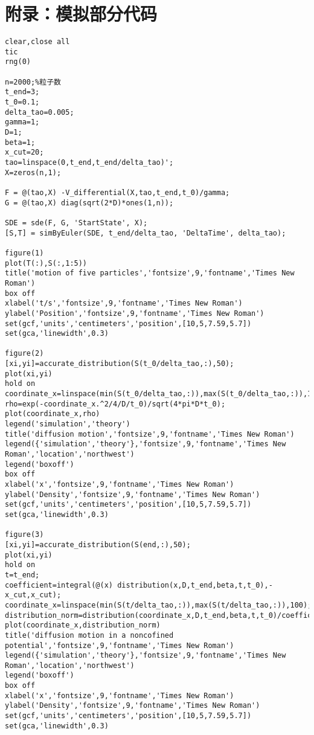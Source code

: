 \section*{附录：模拟部分代码}
\begin{lstlisting}
clear,close all
tic
rng(0)

n=2000;%粒子数 
t_end=3; 
t_0=0.1;
delta_tao=0.005;
gamma=1;
D=1;
beta=1;
x_cut=20;
tao=linspace(0,t_end,t_end/delta_tao)';
X=zeros(n,1);

F = @(tao,X) -V_differential(X,tao,t_end,t_0)/gamma;
G = @(tao,X) diag(sqrt(2*D)*ones(1,n));

SDE = sde(F, G, 'StartState', X);
[S,T] = simByEuler(SDE, t_end/delta_tao, 'DeltaTime', delta_tao);

figure(1)
plot(T(:),S(:,1:5))
title('motion of five particles','fontsize',9,'fontname','Times New Roman')
box off
xlabel('t/s','fontsize',9,'fontname','Times New Roman')
ylabel('Position','fontsize',9,'fontname','Times New Roman')
set(gcf,'units','centimeters','position',[10,5,7.59,5.7])
set(gca,'linewidth',0.3)

figure(2)
[xi,yi]=accurate_distribution(S(t_0/delta_tao,:),50);
plot(xi,yi)
hold on
coordinate_x=linspace(min(S(t_0/delta_tao,:)),max(S(t_0/delta_tao,:)),100);
rho=exp(-coordinate_x.^2/4/D/t_0)/sqrt(4*pi*D*t_0);
plot(coordinate_x,rho)
legend('simulation','theory')
title('diffusion motion','fontsize',9,'fontname','Times New Roman')
legend({'simulation','theory'},'fontsize',9,'fontname','Times New Roman','location','northwest')
legend('boxoff')
box off
xlabel('x','fontsize',9,'fontname','Times New Roman')
ylabel('Density','fontsize',9,'fontname','Times New Roman')
set(gcf,'units','centimeters','position',[10,5,7.59,5.7])
set(gca,'linewidth',0.3)

figure(3)
[xi,yi]=accurate_distribution(S(end,:),50);
plot(xi,yi)
hold on
t=t_end;
coefficient=integral(@(x) distribution(x,D,t_end,beta,t,t_0),-x_cut,x_cut);
coordinate_x=linspace(min(S(t/delta_tao,:)),max(S(t/delta_tao,:)),100);
distribution_norm=distribution(coordinate_x,D,t_end,beta,t,t_0)/coefficient;
plot(coordinate_x,distribution_norm)
title('diffusion motion in a noncofined potential','fontsize',9,'fontname','Times New Roman')
legend({'simulation','theory'},'fontsize',9,'fontname','Times New Roman','location','northwest')
legend('boxoff')
box off
xlabel('x','fontsize',9,'fontname','Times New Roman')
ylabel('Density','fontsize',9,'fontname','Times New Roman')
set(gcf,'units','centimeters','position',[10,5,7.59,5.7])
set(gca,'linewidth',0.3)


\end{lstlisting}
